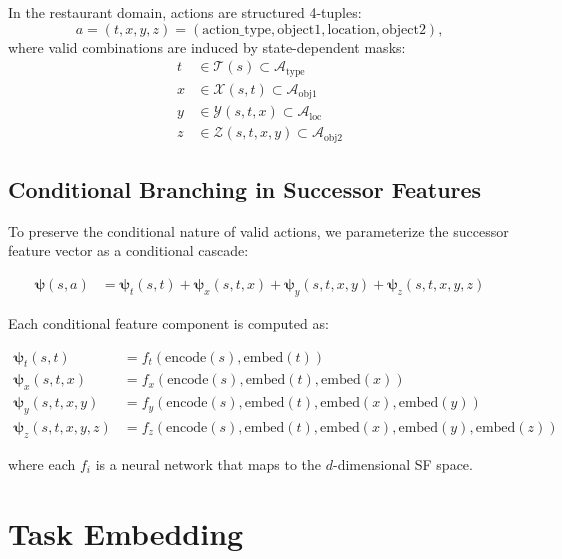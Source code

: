 \documentclass[11pt]{article}
\begin{document}
In the restaurant domain, actions are structured 4-tuples:
\begin{equation}
a = (t, x, y, z) = (\text{action\_type}, \text{object1}, \text{location}, \text{object2}),
\end{equation}
where valid combinations are induced by state-dependent masks:
\begin{align}
t &\in \mathcal{T}(s) \subset \mathcal{A}_{\text{type}} \\
x &\in \mathcal{X}(s, t) \subset \mathcal{A}_{\text{obj1}} \\
y &\in \mathcal{Y}(s, t, x) \subset \mathcal{A}_{\text{loc}} \\
z &\in \mathcal{Z}(s, t, x, y) \subset \mathcal{A}_{\text{obj2}}
\end{align}

\subsection{Conditional Branching in Successor Features}

To preserve the conditional nature of valid actions, we parameterize the successor feature vector as a conditional cascade:

\begin{align}
\bm{\psi}(s, a) &= \bm{\psi}_t(s, t) + \bm{\psi}_x(s, t, x) + \bm{\psi}_y(s, t, x, y) + \bm{\psi}_z(s, t, x, y, z)
\end{align}

Each conditional feature component is computed as:

\begin{align}
\bm{\psi}_t(s, t) &= f_t(\text{encode}(s), \text{embed}(t)) \\
\bm{\psi}_x(s, t, x) &= f_x(\text{encode}(s), \text{embed}(t), \text{embed}(x)) \\
\bm{\psi}_y(s, t, x, y) &= f_y(\text{encode}(s), \text{embed}(t), \text{embed}(x), \text{embed}(y)) \\
\bm{\psi}_z(s, t, x, y, z) &= f_z(\text{encode}(s), \text{embed}(t), \text{embed}(x), \text{embed}(y), \text{embed}(z))
\end{align}

where each $f_i$ is a neural network that maps to the $d$-dimensional SF space.

\section{Task Embedding}
\end{document}
